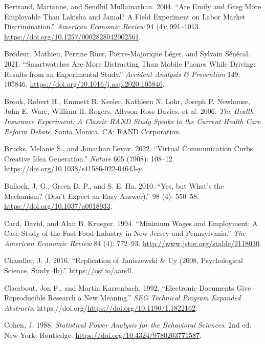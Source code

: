 \documentclass[
  11pt,
  letterpaper,
]{scrbook}
\newlength{\cslhangindent}
\newenvironment{CSLReferences}[2] %
 {\begin{list}{}{%
  \setlength{\itemindent}{0pt}
  \setlength{\leftmargin}{0pt}
  \setlength{\parsep}{0pt}
  \ifodd #1
   \setlength{\leftmargin}{\cslhangindent}
   \setlength{\itemindent}{-1\cslhangindent}
  \fi
  \setlength{\itemsep}{#2\baselineskip}}}
 {\end{list}}
\theoremstyle{definition}
\theoremstyle{definition}
\theoremstyle{remark}
\begin{document}
\begin{CSLReferences}{1}{0}
Bertrand, Marianne, and Sendhil Mullainathan. 2004. {``Are {E}mily and
{G}reg More Employable Than {L}akisha and {J}amal? A Field Experiment on
Labor Market Discrimination.''} \emph{American Economic Review} 94 (4):
991--1013. \url{https://doi.org/10.1257/0002828042002561}.

Brodeur, Mathieu, Perrine Ruer, Pierre-Majorique Léger, and Sylvain
Sénécal. 2021. {``Smartwatches Are More Distracting Than Mobile Phones
While Driving: Results from an Experimental Study.''} \emph{Accident
Analysis \& Prevention} 149: 105846.
\url{https://doi.org/10.1016/j.aap.2020.105846}.

Brook, Robert H., Emmett B. Keeler, Kathleen N. Lohr, Joseph P.
Newhouse, John E. Ware, William H. Rogers, Allyson Ross Davies, et al.
2006. \emph{The {H}ealth {I}nsurance {E}xperiment: A Classic {RAND}
Study Speaks to the Current Health Care Reform Debate}. Santa Monica,
CA: RAND Corporation.

Brucks, Melanie S., and Jonathan Levav. 2022. {``Virtual Communication
Curbs Creative Idea Generation.''} \emph{Nature} 605 (7908): 108--12.
\url{https://doi.org/10.1038/s41586-022-04643-y}.

Bullock, J. G., Green D. P., and S. E. Ha. 2010. {``Yes, but What's the
Mechanism? (Don't Expect an Easy Answer).''} 98 (4): 550--58.
\url{https://doi.org/10.1037/a0018933}.

Card, David, and Alan B. Krueger. 1994. {``Minimum Wages and Employment:
A Case Study of the Fast-Food Industry in {N}ew {J}ersey and
{P}ennsylvania.''} \emph{The American Economic Review} 84 (4): 772--93.
\url{http://www.jstor.org/stable/2118030}.

Chandler, J. J. 2016. {``Replication of {J}aniszewski \& {U}y (2008,
{P}sychological {S}cience, Study 4b).''} \url{https://osf.io/aaudl}.

Claerbout, Jon F., and Martin Karrenbach. 1992. {``Electronic Documents
Give Reproducible Research a New Meaning.''} \emph{SEG Technical Program
Expanded Abstracts}.
https://doi.org/\url{https://doi.org/10.1190/1.1822162}.

Cohen, J. 1988. \emph{Statistical Power Analysis for the Behavioral
Sciences}. 2nd ed. New York: Routledge.
\url{https://doi.org/10.4324/9780203771587}.


\end{CSLReferences}
\end{document}
